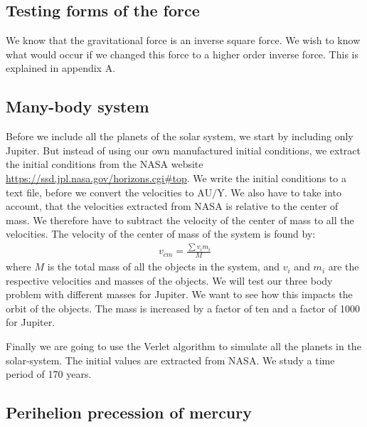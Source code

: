 \documentclass{article}
\begin{document}
\begin{multicols}{2}
\subsection{Testing forms of the force}

We know that the gravitational force is an inverse square force. We wish to know what would occur if we changed this force to a higher order inverse force. This is explained in appendix A.

\subsection{Many-body system}

Before we include all the planets of the solar system, we start by including only Jupiter. But instead of using our own manufactured initial conditions, we extract the initial conditions from the NASA website \url{https://ssd.jpl.nasa.gov/horizons.cgi#top}. We write the initial conditions to a text file, before we convert the velocities to $\text{AU/Y}$. We also have to take into account, that the velocities extracted from NASA is relative to the center of mass. We therefore have to subtract the velocity of the center of mass to all the velocities. The velocity of the center of mass of the system is found by:
\begin{align}
v_{cm} = \frac{\sum v_i m_i}{M}
\end{align}
where $M$ is the total mass of all the objects in the system, and $v_i$ and $m_i$ are the respective velocities and masses of the objects. We will test our three body problem with different masses for Jupiter. We want to see how this impacts the orbit of the objects. The mass is increased by a factor of ten and a factor of 1000 for Jupiter. 

Finally we are going to use the Verlet algorithm to simulate all the planets in the solar-system. The initial values are extracted from NASA. We study a time period of 170 years. 

\subsection{Perihelion precession of mercury}


\end{multicols}
\end{document}
